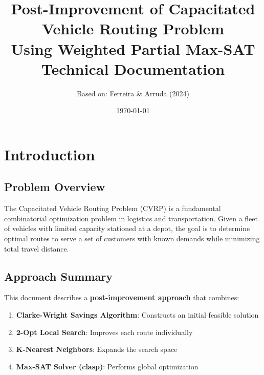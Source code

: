 \documentclass[12pt,a4paper]{article}
\title{\textbf{Post-Improvement of Capacitated Vehicle Routing Problem\\Using Weighted Partial Max-SAT}\\[1em]
\large Technical Documentation}
\author{Based on: Ferreira \& Arruda (2024)}
\date{\today}
\theoremstyle{definition}
\begin{document}
\maketitle

\tableofcontents
\newpage

\section{Introduction}

\subsection{Problem Overview}

The Capacitated Vehicle Routing Problem (CVRP) is a fundamental combinatorial optimization problem in logistics and transportation. Given a fleet of vehicles with limited capacity stationed at a depot, the goal is to determine optimal routes to serve a set of customers with known demands while minimizing total travel distance.

\subsection{Approach Summary}

This document describes a \textbf{post-improvement approach} that combines:
\begin{enumerate}
    \item \textbf{Clarke-Wright Savings Algorithm}: Constructs an initial feasible solution
    \item \textbf{2-Opt Local Search}: Improves each route individually
    \item \textbf{K-Nearest Neighbors}: Expands the search space
    \item \textbf{Max-SAT Solver (clasp)}: Performs global optimization
\end{enumerate}
\end{document}
